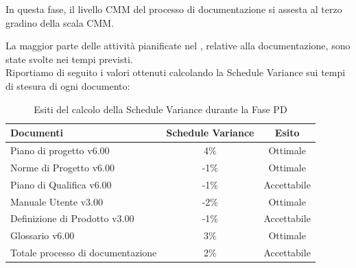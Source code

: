 			In questa fase, il livello CMM del processo di documentazione si assesta al terzo gradino della scala CMM.

			La maggior parte delle attività pianificate nel , relative alla documentazione, sono state svolte nei tempi previsti. \\
			Riportiamo di seguito i valori ottenuti calcolando la Schedule Variance sui tempi di stesura di ogni documento:
			\begin{table}[H]
					\centering
					\begin{tabu}{| l | c | c |}
							\hline
							Documenti 							& Schedule Variance	& Esito		\\ \hline \hline						
							Piano di progetto v6.00				& 4\% 		& Ottimale  \\ \hline
							Norme di Progetto v6.00 			& -1\%		& Ottimale  \\ \hline
							Piano di Qualifica v6.00 			& -1\%		& Accettabile  \\ \hline
							Manuale Utente v3.00 				& -2\%		& Ottimale  \\ \hline
							Definizione di Prodotto v3.00 		& -1\%		& Accettabile  \\ \hline
							Glossario v6.00					 	& 3\% 		& Ottimale  \\ \hline
							Totale processo di documentazione 	& 2\% 		& Accettabile \\ \hline
					\end{tabu}
				\caption{Esiti del calcolo della Schedule Variance durante la Fase PD}
			\end{table}
							
